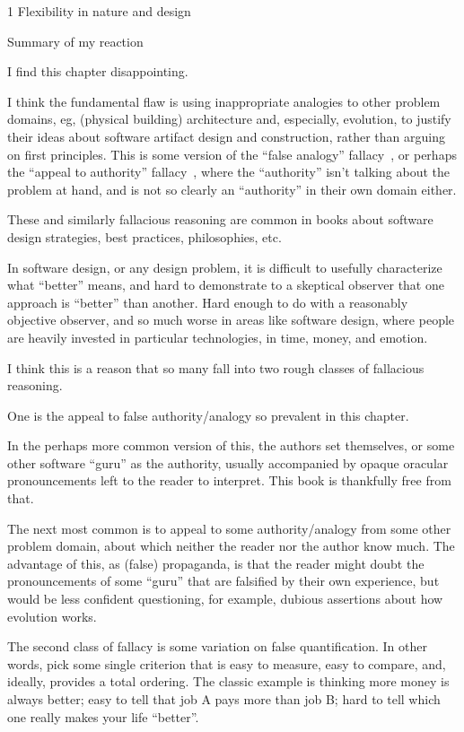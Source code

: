 \documentclass[12pt]{PalisadesLakesBook}
\begin{document}
\begin{plSection}{1 Flexibility in nature and design}
\begin{plSection}{Summary of my reaction}

I find this chapter disappointing.

I think the fundamental flaw is using 
inappropriate analogies to other problem domains,
eg, (physical building) architecture
and, especially, evolution, 
to justify their ideas about software artifact design
and construction,
rather than arguing on first principles.
This is some version of the ``false analogy'' 
fallacy~\cite{wiki:ArgumentFromAnalogyFalse},
or perhaps the
``appeal to authority'' fallacy~\cite{wiki:ArgumentFromAuthority},
where the ``authority'' isn't talking about the problem at hand, 
and is not so clearly an ``authority'' in their own domain either.

These and similarly fallacious reasoning are common
in books about software design strategies, best practices,
philosophies, etc.

In software design, or any design problem,
it is difficult to usefully characterize what ``better'' means,
and hard to demonstrate to a skeptical observer that one
approach is ``better'' than another.
Hard enough to do with a reasonably objective observer,
and so much worse in areas like software design,
where people are heavily invested in particular technologies,
in time, money, and emotion.

I think this is a reason that so many fall into two rough classes
of fallacious reasoning. 

One is the appeal to false authority/analogy so prevalent in this 
chapter. 

In the perhaps more common version of this, the authors set 
themselves, or some other software ``guru'' as the authority, 
usually accompanied by opaque oracular pronouncements 
left to the reader
to interpret.
This book is thankfully free from that.

The next most common is to appeal to some authority/analogy
from some other problem domain,
about which neither the reader nor the author know much.
The advantage of this, as (false) propaganda, 
is that the reader might doubt the pronouncements
of some ``guru'' that are falsified by their own experience,
but would be less confident questioning, for example,
dubious assertions about how evolution works.

The second class of fallacy is some variation on false 
quantification. 
In other words, pick some single criterion that is
easy to measure, easy to compare, and, ideally,
provides a total ordering. 
The classic example is thinking more money is always better;
easy to tell that job A pays more than job B;
hard to tell which one really makes your life ``better''.


\end{plSection}
\end{plSection}
\end{document}

